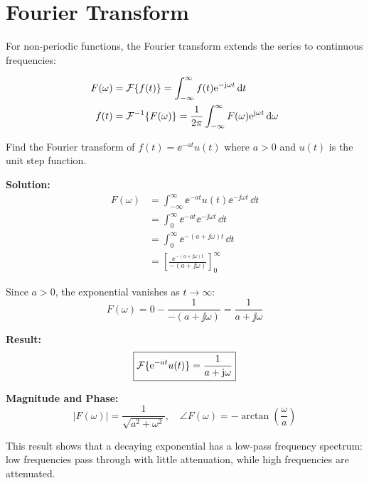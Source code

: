 \section{Fourier Transform}

For non-periodic functions, the Fourier transform extends the series to continuous frequencies:

\begin{definitionbox}[title=Definition 5.1: Fourier Transform]
\begin{align}
F(\omega) &= \mathcal{F}\{f(t)\} = \int_{-\infty}^{\infty} f(t) \mathrm{e}^{-\mathrm{j}\omega t} \, \mathrm{d} t \\
f(t) &= \mathcal{F}^{-1}\{F(\omega)\} = \frac{1}{2\pi} \int_{-\infty}^{\infty} F(\omega) \mathrm{e}^{\mathrm{j}\omega t} \, \mathrm{d}\omega
\end{align}
\end{definitionbox}



\begin{examplebox}[title=Example: Fourier Transform of a Decaying Exponential]
Find the Fourier transform of $f(t) = \ee^{-at}u(t)$ where $a > 0$ and $u(t)$ is the unit step function.

\textbf{Solution:}
\begin{align*}
F(\omega) &= \int_{-\infty}^{\infty} \ee^{-at}u(t) \ee^{-\jj\omega t} \, \dd t \\
&= \int_{0}^{\infty} \ee^{-at} \ee^{-\jj\omega t} \, \dd t \\
&= \int_{0}^{\infty} \ee^{-(a + \jj\omega)t} \, \dd t \\
&= \left[ \frac{\ee^{-(a + \jj\omega)t}}{-(a + \jj\omega)} \right]_{0}^{\infty}
\end{align*}

Since $a > 0$, the exponential vanishes as $t \to \infty$:
\[
F(\omega) = 0 - \frac{1}{-(a + \jj\omega)} = \frac{1}{a + \jj\omega}
\]

\textbf{Result:}
\begin{equation}
\boxed{\mathcal{F}\{\mathrm{e}^{-at}u(t)\} = \frac{1}{a + \mathrm{j}\omega}}
\end{equation}

\textbf{Magnitude and Phase:}
\[
|F(\omega)| = \frac{1}{\sqrt{a^2 + \omega^2}}, \quad \angle F(\omega) = -\arctan\left(\frac{\omega}{a}\right)
\]

This result shows that a decaying exponential has a low-pass frequency spectrum: low frequencies pass through with little attenuation, while high frequencies are attenuated.
\end{examplebox}


